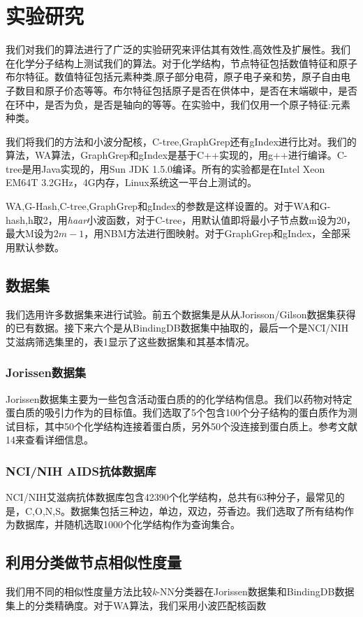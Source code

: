 \documentclass{article}
\begin{document}
\else

\fi
\section{实验研究}
我们对我们的算法进行了广泛的实验研究来评估其有效性,高效性及扩展性。我们在化学分子结构上测试我们的算法。对于化学结构，节点特征包括数值特征和原子布尔特征。数值特征包括元素种类,原子部分电荷，原子电子亲和势，原子自由电子数目和原子价态等等。布尔特征包括原子是否在供体中，是否在末端碳中，是否在环中，是否为负，是否是轴向的等等。在实验中，我们仅用一个原子特征:元素种类。

我们将我们的方法和小波分配核，C-tree,GraphGrep还有gIndex进行比对。我们的算法，WA算法，GraphGrep和gIndex是基于C++实现的，用g++进行编译。C-tree是用Java实现的，用Sun JDK 1.5.0编译。所有的实验都是在Intel Xeon EM64T 3.2GHz，4G内存，Linux系统这一平台上测试的。

WA,G-Hash,C-tree,GraphGrep和gIndex的参数是这样设置的。对于WA和G-hash,h取2，用\emph{haar}小波函数，对于C-tree，用默认值即将最小子节点数m设为20，最大M设为$2m-1$，用NBM方法进行图映射。对于GraphGrep和gIndex，全部采用默认参数。

\subsection{数据集}
我们选用许多数据集来进行试验。前五个数据集是从从Jorisson/Gilson数据集获得的已有数据。接下来六个是从BindingDB数据集中抽取的，最后一个是NCI/NIH 艾滋病筛选集里的，表1显示了这些数据集和其基本情况。
\subsubsection{Jorissen数据集}
Jorissen数据集主要为一些包含活动蛋白质的的化学结构信息。我们以药物对特定蛋白质的吸引力作为的目标值。我们选取了5个包含100个分子结构的蛋白质作为测试目标，其中50个化学结构连接着蛋白质，另外50个没连接到蛋白质上。参考文献14来查看详细信息。

\subsubsection{NCI/NIH AIDS抗体数据库}
NCI/NIH艾滋病抗体数据库包含42390个化学结构，总共有63种分子，最常见的是，C,O,N,S。数据集包括三种边，单边，双边，芬香边。我们选取了所有结构作为数据库，并随机选取1000个化学结构作为查询集合。
\subsection{利用分类做节点相似性度量}
我们用不同的相似性度量方法比较\emph{k}-NN分类器在Jorissen数据集和BindingDB数据集上的分类精确度。对于WA算法，我们采用小波匹配核函数

\ifx\allfiles\undefined
%
%
\end{document}
